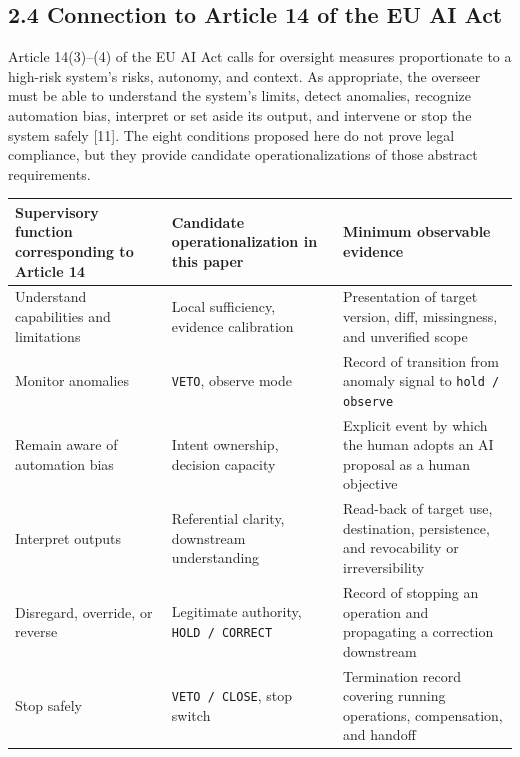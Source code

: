 \subsection{2.4 Connection to Article 14 of the EU AI Act}\label{connection-to-article-14-of-the-eu-ai-act}

Article 14(3)--(4) of the EU AI Act calls for oversight measures proportionate to a high-risk system's risks, autonomy, and context. As appropriate, the overseer must be able to understand the system's limits, detect anomalies, recognize automation bias, interpret or set aside its output, and intervene or stop the system safely {[}11{]}. The eight conditions proposed here do not prove legal compliance, but they provide candidate operationalizations of those abstract requirements.

{\def\LTcaptype{none} %
\begin{longtable}[]{@{}
  >{\raggedright\arraybackslash}p{}
  >{\raggedright\arraybackslash}p{}
  >{\raggedright\arraybackslash}p{}@{}}
\toprule\noalign{}
\begin{minipage}[b]{\linewidth}\raggedright
Supervisory function corresponding to Article 14
\end{minipage} & \begin{minipage}[b]{\linewidth}\raggedright
Candidate operationalization in this paper
\end{minipage} & \begin{minipage}[b]{\linewidth}\raggedright
Minimum observable evidence
\end{minipage} \\
\midrule\noalign{}
\endhead
\bottomrule\noalign{}
\endlastfoot
Understand capabilities and limitations & Local sufficiency, evidence calibration & Presentation of target version, diff, missingness, and unverified scope \\
Monitor anomalies & \passthrough{\lstinline!VETO!}, observe mode & Record of transition from anomaly signal to \passthrough{\lstinline!hold / observe!} \\
Remain aware of automation bias & Intent ownership, decision capacity & Explicit event by which the human adopts an AI proposal as a human objective \\
Interpret outputs & Referential clarity, downstream understanding & Read-back of target use, destination, persistence, and revocability or irreversibility \\
Disregard, override, or reverse & Legitimate authority, \passthrough{\lstinline!HOLD / CORRECT!} & Record of stopping an operation and propagating a correction downstream \\
Stop safely & \passthrough{\lstinline!VETO / CLOSE!}, stop switch & Termination record covering running operations, compensation, and handoff \\
\end{longtable}
}

